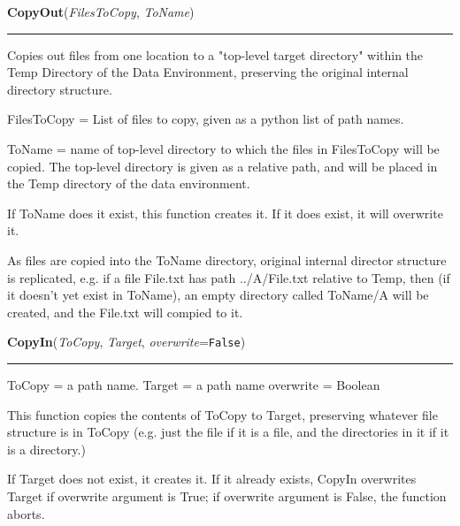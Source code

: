 \hspace{.8\funcindent}\begin{boxedminipage}{\funcwidth}

    \raggedright \textbf{CopyOut}(\textit{FilesToCopy}, \textit{ToName})

    \vspace{-1.5ex}

    \rule{\textwidth}{0.5\fboxrule}
\setlength{\parskip}{2ex}
    Copies out files from one location to a "top-level target directory" 
    within the Temp Directory of the Data Environment, preserving the 
    original internal directory structure.

    FilesToCopy  = List of files to copy, given as a python list of path 
    names.

    ToName = name of top-level directory to which the files in FilesToCopy 
    will be copied.   The top-level directory is given as a relative path, 
    and will be placed in the Temp directory of the data environment.

    If ToName does it exist, this function creates it.  If it does exist, 
    it will overwrite it.

    As files are copied into the ToName directory, original internal 
    director structure is replicated, e.g. if a file File.txt has path 
    ../A/File.txt relative to Temp, then (if it doesn't yet exist in 
    ToName), an empty directory called ToName/A will be created, and the 
    File.txt will compied to it.

\setlength{\parskip}{1ex}
    \end{boxedminipage}

    \label{System:extraction:CopyIn}

    \vspace{0.5ex}

\hspace{.8\funcindent}\begin{boxedminipage}{\funcwidth}

    \raggedright \textbf{CopyIn}(\textit{ToCopy}, \textit{Target}, \textit{overwrite}={\tt False})

    \vspace{-1.5ex}

    \rule{\textwidth}{0.5\fboxrule}
\setlength{\parskip}{2ex}
    ToCopy = a path name. Target = a path name overwrite = Boolean

    This function copies the contents of ToCopy to Target, preserving 
    whatever file structure is in ToCopy (e.g. just the file if it is a 
    file, and the directories in it if it is a directory.)

    If Target does not exist, it creates it.   If it already exists, CopyIn
    overwrites Target if overwrite argument is True; if overwrite argument 
    is False, the function aborts.

\setlength{\parskip}{1ex}
    \end{boxedminipage}

